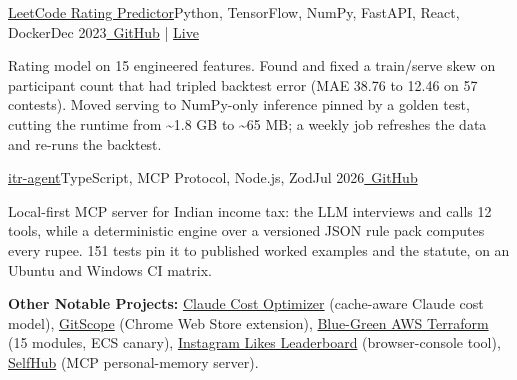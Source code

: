 \resumeExp
{\href{https://leetcode-rating-predictor.onrender.com/}{LeetCode Rating Predictor}}{Python, TensorFlow, NumPy, FastAPI, React, Docker}{Dec 2023}{\href{https://github.com/Sagargupta16/LeetCode_Rating_Predictor}{\faGithub\ GitHub} | \href{https://leetcode-rating-predictor.onrender.com/}{Live}}
\resumeItemListStart
    \item[$\diamond$] Rating model on 15 engineered features. Found and fixed a train/serve skew on participant count that had tripled backtest error (MAE 38.76 to 12.46 on 57 contests). Moved serving to NumPy-only inference pinned by a golden test, cutting the runtime from \textasciitilde1.8 GB to \textasciitilde65 MB; a weekly job refreshes the data and re-runs the backtest.
\resumeItemListEnd

\resumeExp
{\href{https://github.com/Sagargupta16/itr-agent}{itr-agent}}{TypeScript, MCP Protocol, Node.js, Zod}{Jul 2026}{\href{https://github.com/Sagargupta16/itr-agent}{\faGithub\ GitHub}}
\resumeItemListStart
    \item[$\diamond$] Local-first MCP server for Indian income tax: the LLM interviews and calls 12 tools, while a deterministic engine over a versioned JSON rule pack computes every rupee. 151 tests pin it to published worked examples and the statute, on an Ubuntu and Windows CI matrix.
\resumeItemListEnd

\resumeSubHeadingListEnd
\vspace{-2pt}
\small{\textbf{Other Notable Projects:} \href{https://github.com/Sagargupta16/claude-cost-optimizer}{Claude Cost Optimizer} (cache-aware Claude cost model), \href{https://chromewebstore.google.com/detail/gitscope/fndaanihifimmlnmkjdmjbbkbdajolff}{GitScope} (Chrome Web Store extension), \href{https://github.com/Sagargupta16/terraform-aws-ecs-blue-green}{Blue-Green AWS Terraform} (15 modules, ECS canary), \href{https://github.com/Sagargupta16/InstagramLikesLeaderboard}{Instagram Likes Leaderboard} (browser-console tool), \href{https://github.com/Sagargupta16/SelfHub}{SelfHub} (MCP personal-memory server).}
\vspace{-2mm}
